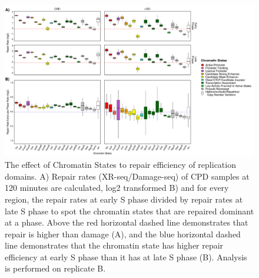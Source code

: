 \begin{figure}[H]
\begin{center}
\includegraphics[width=\textwidth]{Chapters/7_appendix/figures/supfig17}
\caption[The effect of Chromatin States to repair efficiency of replication domains for CPD samples at 120 minutes (replicate B).]{The effect of Chromatin States to repair efficiency of replication domains. A) Repair rates (XR-seq/Damage-seq) of CPD samples at 120 minutes are calculated, log2 transformed B) and for every region, the repair rates at early S phase divided by repair rates at late S phase to spot the chromatin states that are repaired dominant at a phase. Above the red horizontal dashed line demonstrates that repair is higher than damage (A), and the blue horizontal dashed line demonstrates that the chromatin state has higher repair efficiency at early S phase than it has at late S phase (B). Analysis is performed on replicate B.}
\label{supfig:chromatin5}
\end{center}
\end{figure}


